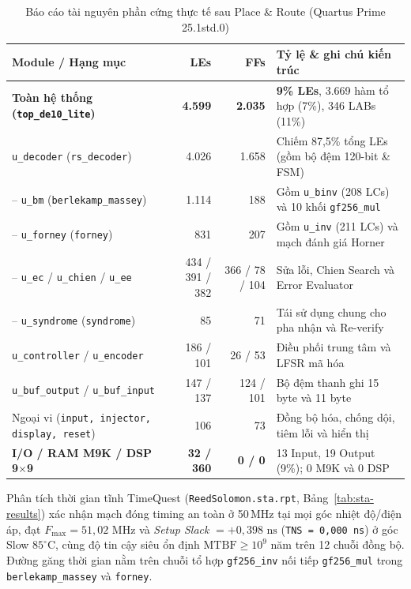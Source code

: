 \begin{table}[!htb]
    \centering
    \caption{Báo cáo tài nguyên phần cứng thực tế sau Place \& Route (Quartus Prime 25.1std.0)}
    \label{tab:quartus-res}
    \footnotesize
    \setlength{\tabcolsep}{4pt}
    \renewcommand{\arraystretch}{1.08}
    \begin{tabular}{l r r p{5.3cm}}
        \toprule
        \textbf{Module / Hạng mục} & \textbf{LEs} & \textbf{FFs} & \textbf{Tỷ lệ \& ghi chú kiến trúc} \\
        \midrule
        \textbf{Toàn hệ thống (\texttt{top\_de10\_lite})} & \textbf{4.599} & \textbf{2.035} & \textbf{9\% LEs}, 3.669 hàm tổ hợp (7\%), 346 LABs (11\%) \\
        \quad \texttt{u\_decoder} (\texttt{rs\_decoder}) & 4.026 & 1.658 & Chiếm 87,5\% tổng LEs (gồm bộ đệm 120-bit \& FSM) \\
        \qquad -- \texttt{u\_bm} (\texttt{berlekamp\_massey}) & 1.114 & 188 & Gồm \texttt{u\_binv} (208 LCs) và 10 khối \texttt{gf256\_mul} \\
        \qquad -- \texttt{u\_forney} (\texttt{forney}) & 831 & 207 & Gồm \texttt{u\_inv} (211 LCs) và mạch đánh giá Horner \\
        \qquad -- \texttt{u\_ec} / \texttt{u\_chien} / \texttt{u\_ee} & 434 / 391 / 382 & 366 / 78 / 104 & Sửa lỗi, Chien Search và Error Evaluator \\
        \qquad -- \texttt{u\_syndrome} (\texttt{syndrome}) & 85 & 71 & Tái sử dụng chung cho pha nhận và Re-verify \\
        \quad \texttt{u\_controller} / \texttt{u\_encoder} & 186 / 101 & 26 / 53 & Điều phối trung tâm và LFSR mã hóa \\
        \quad \texttt{u\_buf\_output} / \texttt{u\_buf\_input} & 147 / 137 & 124 / 101 & Bộ đệm thanh ghi 15 byte và 11 byte \\
        \quad Ngoại vi (\texttt{input, injector, display, reset}) & 106 & 73 & Đồng bộ hóa, chống dội, tiêm lỗi và hiển thị \\
        \midrule
        \textbf{I/O / RAM M9K / DSP 9$\times$9} & \textbf{32 / 360} & \textbf{0 / 0} & 13 Input, 19 Output (9\%); 0 M9K và 0 DSP \\
        \bottomrule
    \end{tabular}
\end{table}

Phân tích thời gian tĩnh TimeQuest (\texttt{ReedSolomon.sta.rpt}, Bảng~\ref{tab:sta-results}) xác nhận mạch đóng timing an toàn ở 50\,MHz tại mọi góc nhiệt độ/điện áp, đạt $F_{\max} = 51{,}02\text{ MHz}$ và \textit{Setup Slack} $= +0{,}398\text{ ns}$ (\texttt{TNS = 0,000 ns}) ở góc Slow $85^{\circ}\text{C}$, cùng độ tin cậy siêu ổn định $\text{MTBF} \ge 10^9$ năm trên 12 chuỗi đồng bộ. Đường găng thời gian nằm trên chuỗi tổ hợp \texttt{gf256\_inv} nối tiếp \texttt{gf256\_mul} trong \texttt{berlekamp\_massey} và \texttt{forney}.

